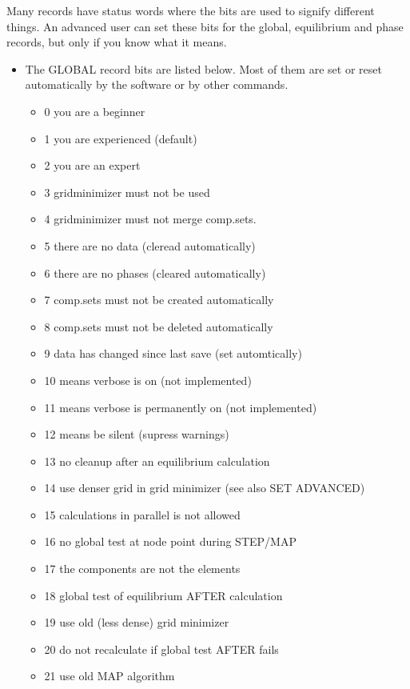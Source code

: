 \documentclass[11pt]{article}
\begin{document}
\hypertarget{helphere}{}
\hypertarget{Set status bit}{}
\hypertarget{Global status bits}{}

Many records have status words where the bits are used to signify
different things.  An advanced user can set these bits for the global,
equilibrium and phase records, but only if you know what it means.
\begin{itemize}
\item The GLOBAL record bits are listed below.  Most of them are
  set or reset automatically by the software or by other commands.
  \begin{itemize}
  \item   0  you are a beginner
  \item   1  you are experienced (default)
  \item   2  you are an expert
  \item   3  gridminimizer must not be used
  \item   4  gridminimizer must not merge comp.sets.
  \item   5  there are no data (cleread automatically)
  \item   6  there are no phases (cleared automatically)
  \item   7  comp.sets must not be created automatically
  \item   8  comp.sets must not be deleted automatically
  \item   9  data has changed since last save (set automtically)
  \item  10  means verbose is on (not implemented)
  \item  11  means verbose is permanently on (not implemented)
  \item  12  means be silent (supress warnings)
  \item  13  no cleanup after an equilibrium calculation
  \item  14  use denser grid in grid minimizer (see also SET ADVANCED)
  \item  15  calculations in parallel is not allowed
  \item  16  no global test at node point during STEP/MAP
  \item  17  the components are not the elements
  \item  18  global test of equilibrium AFTER calculation
  \item  19  use old (less dense) grid minimizer
  \item  20  do not recalculate if global test AFTER fails
  \item  21  use old MAP algorithm

\end{itemize}
\end{itemize}
\end{document}
